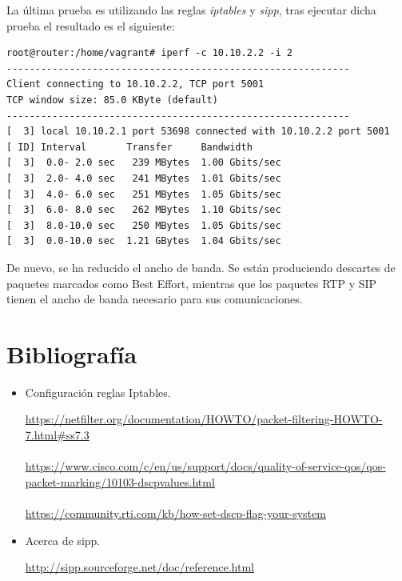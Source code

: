 \documentclass[11pt]{article}
\begin{document}
La última prueba es utilizando las reglas \textit{iptables} y \textit{sipp}, tras ejecutar dicha prueba el resultado es el siguiente:
\begin{lstlisting}[style=C,numbers=none]
root@router:/home/vagrant# iperf -c 10.10.2.2 -i 2
------------------------------------------------------------
Client connecting to 10.10.2.2, TCP port 5001
TCP window size: 85.0 KByte (default)
------------------------------------------------------------
[  3] local 10.10.2.1 port 53698 connected with 10.10.2.2 port 5001
[ ID] Interval       Transfer     Bandwidth
[  3]  0.0- 2.0 sec   239 MBytes  1.00 Gbits/sec
[  3]  2.0- 4.0 sec   241 MBytes  1.01 Gbits/sec
[  3]  4.0- 6.0 sec   251 MBytes  1.05 Gbits/sec
[  3]  6.0- 8.0 sec   262 MBytes  1.10 Gbits/sec
[  3]  8.0-10.0 sec   250 MBytes  1.05 Gbits/sec
[  3]  0.0-10.0 sec  1.21 GBytes  1.04 Gbits/sec
\end{lstlisting}

De nuevo, se ha reducido el ancho de banda. Se están produciendo descartes de paquetes marcados como Best Effort, mientras que los paquetes RTP y SIP tienen el ancho de banda necesario para sus comunicaciones.
\section{Bibliografía}

\begin{itemize}
	\item Configuración reglas Iptables.

	\url{https://netfilter.org/documentation/HOWTO/packet-filtering-HOWTO-7.html#ss7.3}\\ \\
	\url{https://www.cisco.com/c/en/us/support/docs/quality-of-service-qos/qos-packet-marking/10103-dscpvalues.html}\\ \\
	\url{https://community.rti.com/kb/how-set-dscp-flag-your-system}
	
	\item Acerca de sipp.
	
	\url{http://sipp.sourceforge.net/doc/reference.html}
\end{itemize}
\end{document}
